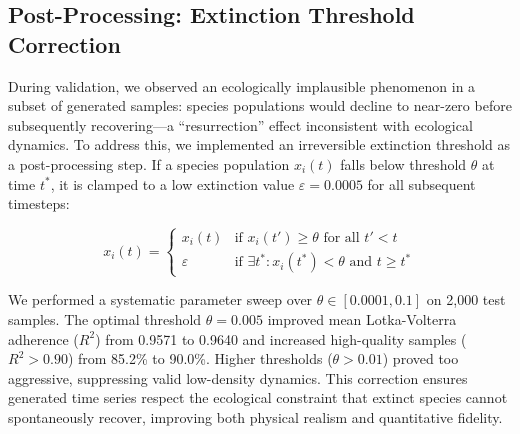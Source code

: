 
\subsection{Post-Processing: Extinction Threshold Correction}

During validation, we observed an ecologically implausible phenomenon in a subset of generated samples: species populations would decline to near-zero before subsequently recovering---a ``resurrection'' effect inconsistent with ecological dynamics. To address this, we implemented an irreversible extinction threshold as a post-processing step. If a species population $x_i(t)$ falls below threshold $\theta$ at time $t^*$, it is clamped to a low extinction value $\varepsilon = 0.0005$ for all subsequent timesteps:

\begin{equation}
x_i(t) =
\begin{cases}
x_i(t) & \text{if } x_i(t') \geq \theta \text{ for all } t' < t \\
\varepsilon & \text{if } \exists t^*: x_i(t^*) < \theta \text{ and } t \geq t^*
\end{cases}
\end{equation}

We performed a systematic parameter sweep over $\theta \in [0.0001, 0.1]$ on 2,000 test samples. The optimal threshold $\theta = 0.005$ improved mean Lotka-Volterra adherence ($R^2$) from 0.9571 to 0.9640 and increased high-quality samples ($R^2 > 0.90$) from 85.2\% to 90.0\%. Higher thresholds ($\theta > 0.01$) proved too aggressive, suppressing valid low-density dynamics. This correction ensures generated time series respect the ecological constraint that extinct species cannot spontaneously recover, improving both physical realism and quantitative fidelity.
